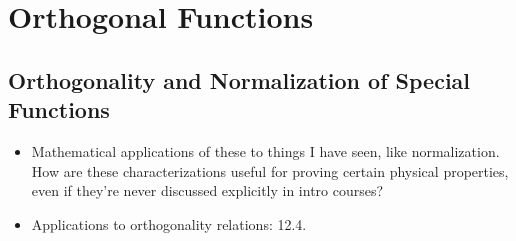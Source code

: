 \documentclass[../finalProject.tex]{subfiles}
\begin{document}
\section{Orthogonal Functions}\label{sch:12}
\setcounter{subsection}{3}
\subsection{Orthogonality and Normalization of Special Functions}
\begin{itemize}
    \item {}Mathematical applications of these to things I have seen, like normalization. How are these characterizations useful for proving certain physical properties, even if they're never discussed explicitly in intro courses?
    \item Applications to orthogonality relations: 12.4.
\end{itemize}
\end{document}
